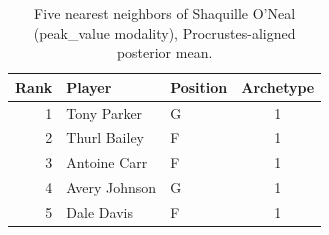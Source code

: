 \begin{table}[htbp]
  \centering\small
  \begin{tabular}{rllc}
    \toprule
    Rank & Player & Position & Archetype \\
    \midrule
    1 & Tony Parker & G & 1 \\
    2 & Thurl Bailey & F & 1 \\
    3 & Antoine Carr & F & 1 \\
    4 & Avery Johnson & G & 1 \\
    5 & Dale Davis & F & 1 \\
    \bottomrule
  \end{tabular}
  \caption{Five nearest neighbors of Shaquille O'Neal (peak_value modality), Procrustes-aligned posterior mean.}
  \label{tab:Shaquille_O_Neal_neighbors_peak_value}
\end{table}

